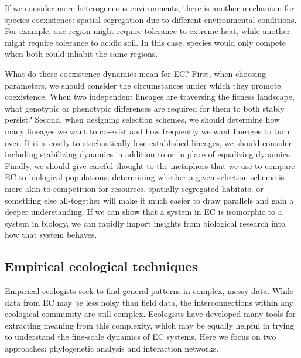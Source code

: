 If we consider more heterogeneous environments, there is another mechanism for species coexistence: spatial segregation due to different environmental conditions. For example, one region might require tolerance to extreme heat, while another might require tolerance to acidic soil. In this case, species would only compete when both could inhabit the same regions.

What do these coexistence dynamics mean for EC? First, when choosing parameters, we should consider the circumstances under which they promote coexistence.  When two independent lineages are traversing the fitness landscape, what genotypic or phenotypic differences are required for them to both stably persist?
Second, when designing selection schemes, we should determine how many lineages we want to co-exist and how frequently we want lineages to turn over.  If it is costly to stochastically lose established lineages, we should consider including stabilizing dynamics in addition to or in place of equalizing dynamics. 
Finally, we should give careful thought to the metaphors that we use to compare EC to biological populations; determining whether a given selection scheme is more akin to competition for resources, spatially segregated habitats, or something else all-together will make it much easier to draw parallels and gain a deeper understanding. If we can show that a system in EC is isomorphic to a system in biology, we can rapidly import insights from biological research into how that system behaves.

\subsection{Empirical ecological techniques}

Empirical ecologists seek to find general patterns in complex, messy data. While data from EC may be less noisy than field data, the interconnections within any ecological community are still complex. %
Ecologists have developed many tools for extracting meaning from this complexity, which may be equally helpful in trying to understand the fine-scale dynamics of EC systems. Here we focus on two approaches: phylogenetic analysis and interaction networks.

